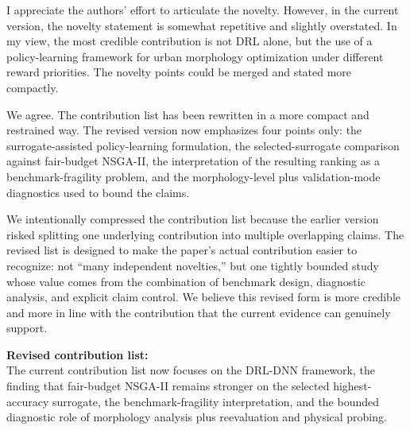 \begin{ReviewerComment}
I appreciate the authors' effort to articulate the novelty. However, in the current version, the novelty statement is somewhat repetitive and slightly overstated. In my view, the most credible contribution is not DRL alone, but the use of a policy-learning framework for urban morphology optimization under different reward priorities. The novelty points could be merged and stated more compactly.
\end{ReviewerComment}
%
\begin{Answer}
We agree. The contribution list has been rewritten in a more compact and restrained way. The revised version now emphasizes four points only: the surrogate-assisted policy-learning formulation, the selected-surrogate comparison against fair-budget NSGA-II, the interpretation of the resulting ranking as a benchmark-fragility problem, and the morphology-level plus validation-mode diagnostics used to bound the claims.

We intentionally compressed the contribution list because the earlier version risked splitting one underlying contribution into multiple overlapping claims. The revised list is designed to make the paper's actual contribution easier to recognize: not ``many independent novelties,'' but one tightly bounded study whose value comes from the combination of benchmark design, diagnostic analysis, and explicit claim control. We believe this revised form is more credible and more in line with the contribution that the current evidence can genuinely support.
\end{Answer}
\begin{RevisionExcerpt}
\noindent\textbf{Revised contribution list:}\\
The current contribution list now focuses on the DRL-DNN framework, the finding that fair-budget NSGA-II remains stronger on the selected highest-accuracy surrogate, the benchmark-fragility interpretation, and the bounded diagnostic role of morphology analysis plus reevaluation and physical probing.
\end{RevisionExcerpt}

